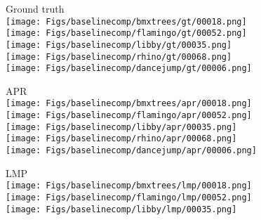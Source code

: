 \documentclass[runningheads]{llncs}
\newlength\figwidth
\newlength\figmarginv
\newlength\figmargin
\begin{document}
\setlength{\figwidth}{0.16\textwidth}

\begin{figure*}[t]
\begin{center}
		\begin{subfigure}[b]{\figwidth}\centering Ground truth \vspace{\figmarginv} \\
			\vspace{-0.1cm}
			\texttt{[image: Figs/baselinecomp/bmxtrees/gt/00018.png]} \\
			\texttt{[image: Figs/baselinecomp/flamingo/gt/00052.png]} \\
            \texttt{[image: Figs/baselinecomp/libby/gt/00035.png]} \\
\texttt{[image: Figs/baselinecomp/rhino/gt/00068.png]} \\
            \texttt{[image: Figs/baselinecomp/dancejump/gt/00006.png]} \\
\end{subfigure}\hfill
		\begin{subfigure}[b]{\figwidth}\centering APR \cite{KohCVPR17} \vspace{\figmarginv} \\
			\vspace{-0.1cm}
			\texttt{[image: Figs/baselinecomp/bmxtrees/apr/00018.png]} \\
			\texttt{[image: Figs/baselinecomp/flamingo/apr/00052.png]} \\
			\texttt{[image: Figs/baselinecomp/libby/apr/00035.png]} \\
\texttt{[image: Figs/baselinecomp/rhino/apr/00068.png]} \\
		    \texttt{[image: Figs/baselinecomp/dancejump/apr/00006.png]} \\
\end{subfigure}\hfill
		\begin{subfigure}[b]{\figwidth}\centering LMP~\cite{TokmakovCVPR2017} \vspace{\figmarginv} \\
			\vspace{-0.1cm}
			\texttt{[image: Figs/baselinecomp/bmxtrees/lmp/00018.png]} \\
			\texttt{[image: Figs/baselinecomp/flamingo/lmp/00052.png]} \\
			\texttt{[image: Figs/baselinecomp/libby/lmp/00035.png]} \\

\end{subfigure}
\end{center}
\end{figure*}
\end{document}
